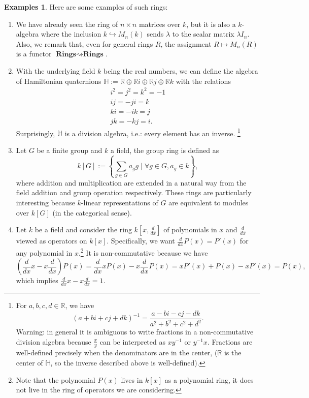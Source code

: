 \documentclass{tufte-handout} %
\theoremstyle{definition}
\newtheorem{exmps}[thm]{Examples}
\theoremstyle{remark}
\newcommand{\bra}[1]{\left(#1\right)}
\newcommand{\R}{\mathbb{R}}
\newcommand{\bH}{\mathbb{H}}
\begin{document}
\begin{exmps}\label{exmpnoncomm}
	Here are some examples of such rings:
	\begin{enumerate}
		\item We have already seen the ring of $n\times n$ matrices over $k$, but it is also a $k$-algebra where the inclusion $k\hookrightarrow M_n(k)$ sends $\lambda$ to the scalar matrix $\lambda I_n$. Also, we remark that, even for general rings $R$, the assignment $R \mapsto M_n(R)$ is a functor $\textbf{Rings}\rightsquigarrow \textbf{Rings}$.
		\item With the underlying field $k$ being the real numbers, we can define the algebra of Hamiltonian quaternions $\bH := \R \oplus \R i \oplus \R j \oplus \R k$ with the relations 
		\begin{gather*}
			i^2=j^2=k^2=-1\\
			ij = -ji = k\\
			ki = -ik = j\\
			jk = -kj = i.
		\end{gather*} Surprisingly, $\bH$ is a division algebra, i.e.: every element has an inverse. \footnote{For $a,b,c,d \in \R$, we have \[(a+bi+cj+dk)^{-1} = \frac{a-bi-cj-dk}{a^2+b^2+c^2+d^2}.\] Warning: in general it is ambiguous to write fractions in a non-commutative division algebra because $\frac{x}{y}$ can be interpreted as $xy^{-1}$ or $y^{-1}x$. Fractions are well-defined precisely when the denominators are in the center, ($\R$ is the center of $\bH$, so the inverse described above is well-defined).}
		\item Let $G$ be a finite group and $k$ a field, the group ring is defined as \[k[G] := \left\{\sum_{g \in G} a_gg \mid \forall g \in G, a_g \in k\right\},\]where addition and multiplication are extended in a natural way from the field addition and group operation respectively. These rings are particularly interesting because $k$-linear representations of $G$ are equivalent to modules over $k[G]$ (in the categorical sense). 
		\item Let $k$ be a field and consider the ring $k[x,\frac{d}{dx}]$ of polynomials in $x$ and $\frac{d}{dx}$ viewed as operators on $k[x]$. Specifically, we want $\frac{d}{dx}P(x) = P'(x)$ for any polynomial in $x$.\footnote{Note that the polynomial $P(x)$ lives in $k[x]$ as a polynomial ring, it does not live in the ring of operators we are considering.} It is non-commutative because we have \[\bra{\frac{d}{dx}x - x\frac{d}{dx}}P(x) = \frac{d}{dx}xP(x) - x\frac{d}{dx}P(x) = xP'(x) + P(x) - xP'(x) = P(x),\] which implies $\frac{d}{dx}x - x\frac{d}{dx} = 1$.
	\end{enumerate}
\end{exmps}
\end{document}
